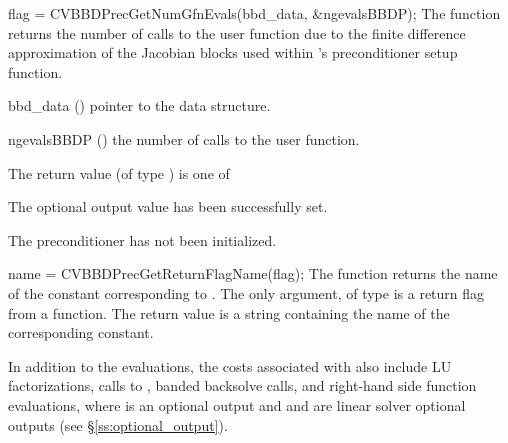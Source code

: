 {
  flag = CVBBDPrecGetNumGfnEvals(bbd\_data, \&ngevalsBBDP);
}
{
  The function  returns the
  number of calls to the user  function due to the 
  finite difference approximation of the Jacobian blocks used within
  {\cvbbdpre}'s preconditioner setup function.
}
{
  \begin{args}[ngevalsBBDP]
  \item[bbd\_data] ()
    pointer to the {\cvbbdpre} data structure.
  \item[ngevalsBBDP] ()
    the number of calls to the user  function.
  \end{args}
}
{
  The return value  (of type ) is one of
  \begin{args}
  \item[\Id{CVBBDPRE\_SUCCESS}] 
    The optional output value has been successfully set.
  \item[\Id{CVBBDPRE\_PDATA\_NULL}]
    The {\cvbbdpre} preconditioner has not been initialized.
  \end{args}
}
{}
{
  name = CVBBDPrecGetReturnFlagName(flag);
}
{
  The function  returns the
  name of the {\cvbbdpre} constant corresponding to .
}
{
  The only argument, of type  is a return flag from a {\cvbbdpre} function.
}
{
  The return value is a string containing the name of the corresponding constant.
}
{}

In addition to the   evaluations,
the costs associated with {\cvbbdpre} also include  LU
factorizations,  calls to ,  banded
backsolve calls, and  right-hand side function evaluations,
where  is an optional {\cvode} output and  and 
 are linear solver optional outputs (see \S\ref{ss:optional_output}).
